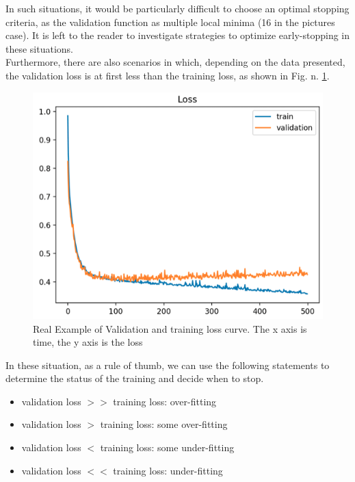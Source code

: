 In such situations, it would be particularly difficult to choose an optimal stopping criteria, as the validation function as multiple local minima (16 in the pictures case). It is left to the reader to investigate strategies to optimize early-stopping in these situations. \\
Furthermore, there are also scenarios in which, depending on the data presented, the validation loss is at first less than the training loss, as shown in Fig. n. \ref{fig:over_fitting_curve_2}. 
\begin{figure}[htb]
    \centering
    \includegraphics[scale = 0.4]{img/over_fitting_2.png}
    \caption[Real Example of the Validation and training loss curve]{Real Example of Validation and training loss curve. The x axis is time, the y axis is the loss}
    \label{fig:over_fitting_curve_2}
\end{figure}

In these situation, as a rule of thumb, we can use the following statements to determine the status of the training and decide when to stop. 
\begin{itemize}
\item validation loss $>>$ training loss: over-fitting
\item validation loss $>$ training loss: some over-fitting
\item validation loss $<$ training loss: some under-fitting
\item validation loss $<<$ training loss: under-fitting

\end{itemize}


